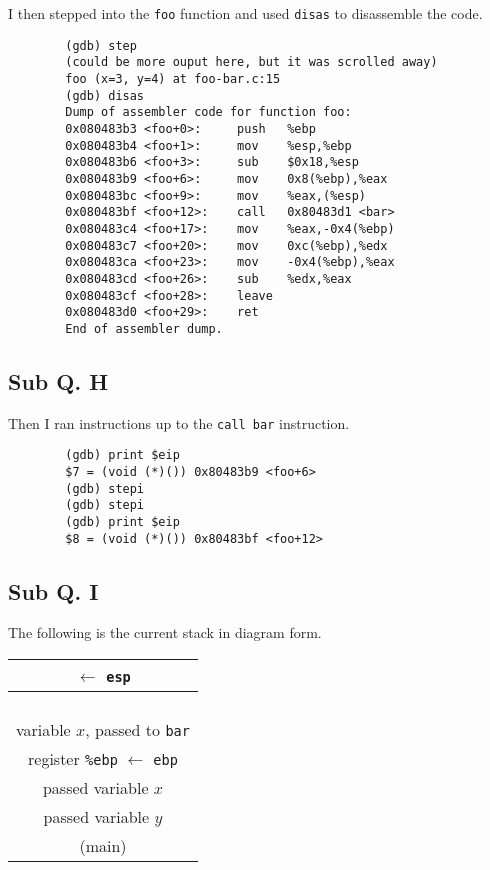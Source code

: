 \documentclass[letterpaper, 10pt]{article}
\begin{document}
	I then stepped into the {\tt foo} function and used {\tt disas} to disassemble the code.

	\begin{verbatim}
		(gdb) step
		(could be more ouput here, but it was scrolled away)
		foo (x=3, y=4) at foo-bar.c:15
		(gdb) disas
		Dump of assembler code for function foo:
		0x080483b3 <foo+0>:     push   %ebp
		0x080483b4 <foo+1>:     mov    %esp,%ebp
		0x080483b6 <foo+3>:     sub    $0x18,%esp
		0x080483b9 <foo+6>:     mov    0x8(%ebp),%eax
		0x080483bc <foo+9>:     mov    %eax,(%esp)
		0x080483bf <foo+12>:    call   0x80483d1 <bar>
		0x080483c4 <foo+17>:    mov    %eax,-0x4(%ebp)
		0x080483c7 <foo+20>:    mov    0xc(%ebp),%edx
		0x080483ca <foo+23>:    mov    -0x4(%ebp),%eax
		0x080483cd <foo+26>:    sub    %edx,%eax
		0x080483cf <foo+28>:    leave
		0x080483d0 <foo+29>:    ret
		End of assembler dump.
	\end{verbatim}

	\subsection*{Sub Q. H}

	Then I ran instructions up to the {\tt call bar} instruction.

	\begin{verbatim}
		(gdb) print $eip
		$7 = (void (*)()) 0x80483b9 <foo+6>
		(gdb) stepi
		(gdb) stepi
		(gdb) print $eip
		$8 = (void (*)()) 0x80483bf <foo+12>
	\end{verbatim}

	\subsection*{Sub Q. I}

	The following is the current stack in diagram form.

	\vspace{1em}
	\begin{tabular} { | c | }
		$\longleftarrow$ {\tt esp} \\ \hline
		\\ \hline
		\\ \hline
		\\ \hline
		\\ \hline
		variable $x$, passed to {\tt bar} \\ \hline
		register {\tt \%ebp} $\longleftarrow$ {\tt ebp} \\ \hline
		passed variable $x$ \\ \hline
		passed variable $y$ \\
		\hline \hline
		(main) \\
	\end{tabular}
\end{document}
